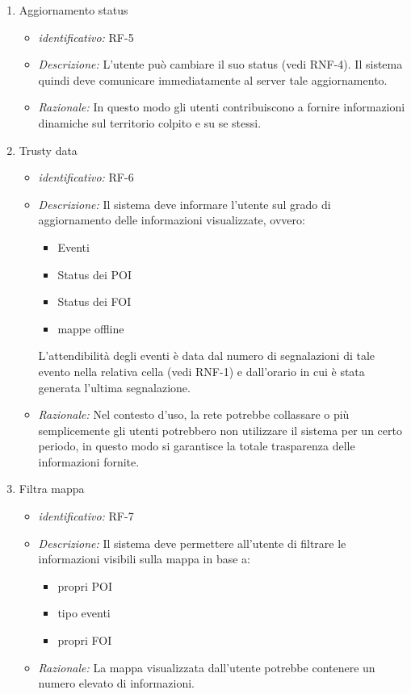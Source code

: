 \begin{enumerate}
   \item Aggiornamento status
  \begin{itemize}
  \item\textit{identificativo:} RF-5
  \item\textit{Descrizione:} L’utente può cambiare il suo status (vedi RNF-4). Il sistema quindi deve comunicare immediatamente al server tale aggiornamento.
  \item\textit{ Razionale:} In questo modo gli utenti contribuiscono a fornire informazioni dinamiche sul territorio colpito e su se stessi.
  \end{itemize}
  
  \item Trusty data
  \begin{itemize}
  \item\textit{identificativo:} RF-6
  \item\textit{Descrizione:} Il sistema deve informare l’utente sul grado di aggiornamento delle informazioni visualizzate, ovvero:
    \begin{itemize}
    \item Eventi
    \item Status dei POI
    \item Status dei FOI
    \item mappe offline
    \end{itemize}
   L’attendibilità degli eventi è data dal numero di segnalazioni di tale evento nella relativa cella (vedi RNF-1) e dall’orario in cui è stata generata l’ultima    segnalazione.
   \item\textit{ Razionale:} Nel contesto d’uso, la rete potrebbe collassare o più semplicemente gli utenti potrebbero non utilizzare il sistema per un certo periodo, in questo modo si garantisce la totale trasparenza delle informazioni fornite.
  \end{itemize}
  
  \item Filtra mappa
  \begin{itemize}
  \item\textit{identificativo:} RF-7
  \item\textit{Descrizione:} Il sistema deve permettere all’utente di filtrare le informazioni visibili sulla mappa in base a:
    \begin{itemize}
    \item propri POI
    \item tipo eventi
    \item propri FOI
    \end{itemize}
   \item\textit{ Razionale:} La mappa visualizzata dall’utente potrebbe contenere un numero elevato di informazioni.
  \end{itemize}
  

\end{enumerate}
